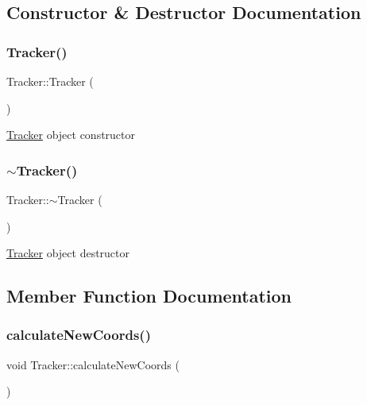 \subsection{Constructor \& Destructor Documentation}
\mbox{\label{class_tracker_adf214393a14e8bf23de2fc8231e239ec}} 
\subsubsection{\texorpdfstring{Tracker()}{Tracker()}}
{\footnotesize\ttfamily Tracker\+::\+Tracker (\begin{DoxyParamCaption}{ }\end{DoxyParamCaption})}

\mbox{\hyperlink{class_tracker}{Tracker}} object constructor \mbox{\label{class_tracker_a0ed1e23312cfe7fcfe5f2ac2abd69163}} 
\subsubsection{\texorpdfstring{$\sim$\+Tracker()}{~Tracker()}}
{\footnotesize\ttfamily Tracker\+::$\sim$\+Tracker (\begin{DoxyParamCaption}{ }\end{DoxyParamCaption})}

\mbox{\hyperlink{class_tracker}{Tracker}} object destructor 

\subsection{Member Function Documentation}
\mbox{\label{class_tracker_a80e4f6083c23a2bcacea30a25bbe736d}} 
\subsubsection{\texorpdfstring{calculate\+New\+Coords()}{calculateNewCoords()}}
{\footnotesize\ttfamily void Tracker\+::calculate\+New\+Coords (\begin{DoxyParamCaption}{ }\end{DoxyParamCaption})}

